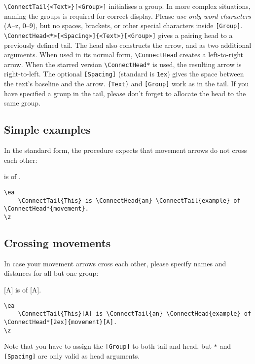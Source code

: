 \noindent\verb+\ConnectTail{<Text>}[<Group>]+ initialises a group. In more complex situations, naming the groups is required for correct display. Please \emph{use only word characters} (A--z, 0--9), but no spaces, brackets, or other special characters inside \verb+[Group]+.\\ 

\noindent\verb+\ConnectHead<*>[<Spacing>]{<Text>}[<Group>]+ gives a pairing head to a previously defined tail. The head also constructs the arrow, and as two additional arguments. When used in its normal form, \verb+\ConnectHead+ creates a left-to-right arrow. When the starred version \verb+\ConnectHead*+ is used, the resulting arrow is right-to-left. The optional \verb+[Spacing]+ (standard is \verb+1ex+) gives the space between the text's baseline and the arrow. \verb+{Text}+ and \verb+[Group]+ work as in the tail. If you have specified a group in the tail, please don't forget to allocate the head to the same group.

\subsection{Simple examples}
In the standard form, the procedure expects that movement arrows do not cross each other:

\ea {} is   of .\\
\begin{lstlisting}
\ea 
    \ConnectTail{This} is \ConnectHead{an} \ConnectTail{example} of \ConnectHead*{movement}. 
\z
\end{lstlisting}
\z

\subsection{Crossing movements}
In case your movement arrows cross each other, please specify names and distances for all but one group:

\ea {}[A] is   of [A].\\
\begin{lstlisting}
\ea 
    \ConnectTail{This}[A] is \ConnectTail{an} \ConnectHead{example} of \ConnectHead*[2ex]{movement}[A]. 
\z
\end{lstlisting}
\z
Note that you have to assign the \verb+[Group]+ to both tail and head, but \verb+*+ and \verb+[Spacing]+ are only valid as head arguments.

